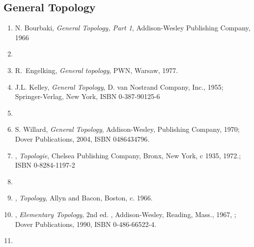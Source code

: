 \documentclass[12pt]{article}
\begin{document}
\subsection*{General Topology}
\begin{enumerate}
\item N. Bourbaki, \emph{General Topology, Part 1},
Addison-Wesley Publishing Company, 1966
\item {}
\item R.~Engelking, \emph{General topology}, PWN, Warsaw, 1977.
\item J.L. Kelley, \emph{General Topology}, 
D. van Nostrand Company, Inc., 1955; Springer-Verlag, New York, ISBN 0-387-90125-6
\item {}
\item S. Willard, \emph{General Topology},
Addison-Wesley, Publishing Company, 1970; Dover Publications, 2004, ISBN 0486434796.
\item {}, \emph{Topologie}, Chelsea Publishing Company,
Bronx, New York, c 1935, 1972.; ISBN 0-8284-1197-2
\item {}
\item {}, \emph{Topology}, Allyn and Bacon, Boston, c. 1966.
\item {}, \emph{Elementary Topology}, 2nd ed. , Addison-Wesley,
Reading, Mass., 1967, ; Dover Publications, 1990, ISBN 0-486-66522-4.
\item {}
\end{enumerate}
\end{document}

